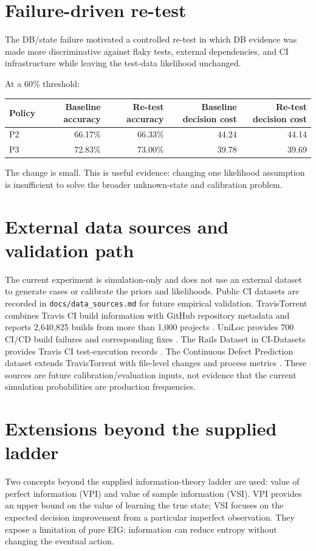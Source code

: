 \documentclass[11pt]{article}
\begin{document}
\section{Failure-driven re-test}
The DB/state failure motivated a controlled re-test in which DB evidence was made more discriminative against flaky tests, external dependencies, and CI infrastructure while leaving the test-data likelihood unchanged.

At a 60\% threshold:

\begin{center}
\begin{tabular}{lrrrr}
\toprule
Policy & Baseline accuracy & Re-test accuracy & Baseline decision cost & Re-test decision cost\\
\midrule
P2 & 66.17\% & 66.33\% & 44.24 & 44.14\\
P3 & 72.83\% & 73.00\% & 39.78 & 39.69\\
\bottomrule
\end{tabular}
\end{center}

The change is small. This is useful evidence: changing one likelihood assumption is insufficient to solve the broader unknown-state and calibration problem.

\section{External data sources and validation path}
The current experiment is simulation-only and does not use an external dataset to generate cases or calibrate the priors and likelihoods. Public CI datasets are recorded in \texttt{docs/data\_sources.md} for future empirical validation. TravisTorrent combines Travis CI build information with GitHub repository metadata and reports 2,640,825 builds from more than 1,000 projects \cite{beller2017travistorrent}. UniLoc provides 700 CI/CD build failures and corresponding fixes \cite{uniloc}. The Rails Dataset in CI-Datasets provides Travis CI test-execution records \cite{railsdataset}. The Continuous Defect Prediction dataset extends TravisTorrent with file-level changes and process metrics \cite{madeyski2017cdp}. These sources are future calibration/evaluation inputs, not evidence that the current simulation probabilities are production frequencies.

\section{Extensions beyond the supplied ladder}
Two concepts beyond the supplied information-theory ladder are used: value of perfect information (VPI) and value of sample information (VSI). VPI provides an upper bound on the value of learning the true state; VSI focuses on the expected decision improvement from a particular imperfect observation. They expose a limitation of pure EIG: information can reduce entropy without changing the eventual action.
\end{document}
